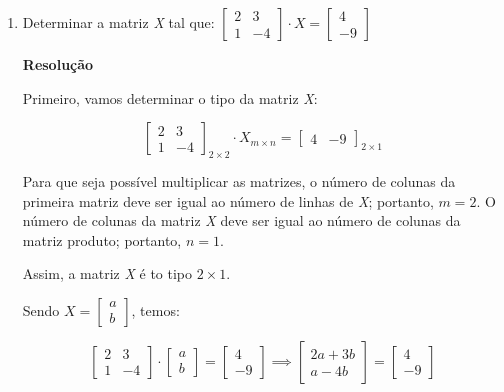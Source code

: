 \begin{exercise}\leavevmode
	\begin{enumerate}
		\item {
		      Determinar a matriz \textit{X} tal que: $\begin{bmatrix}
				      2 & 3  \\
				      1 & -4
			      \end{bmatrix} \cdot X = \begin{bmatrix}
				      4 \\
				      -9
			      \end{bmatrix}$

		      \vspace{.3cm}
		      \textbf{Resolução}
		      \vspace{.3cm}

		      Primeiro, vamos determinar o tipo da matriz \textit{X}:

		      \begin{equation*}
			      \begin{bmatrix}
				      2 & 3  \\
				      1 & -4
			      \end{bmatrix}_{2 \times 2} \cdot X_{m \times n} = \begin{bmatrix}
				      4 & -9
			      \end{bmatrix}_{2 \times 1}
		      \end{equation*}

		      Para que seja possível multiplicar as matrizes, o número de colunas da primeira
		      matriz deve ser igual ao número de linhas de \textit{X}; portanto, $m = 2$. O número
		      de colunas da matriz \textit{X} deve ser igual ao número de colunas da matriz produto;
		      portanto, $n = 1$.

		      Assim, a matriz \textit{X} é to tipo $2 \times 1$.

		      Sendo $X = \begin{bmatrix}
				      a \\ b
			      \end{bmatrix}$, temos:

		      \begin{equation*}
			      \begin{bmatrix}
				      2 & 3  \\
				      1 & -4
			      \end{bmatrix} \cdot \begin{bmatrix}
				      a \\
				      b
			      \end{bmatrix} = \begin{bmatrix}
				      4 \\
				      -9
			      \end{bmatrix} \implies \begin{bmatrix}
				      2a + 3b \\
				      a - 4b
			      \end{bmatrix} = \begin{bmatrix}
				      4 \\
				      -9
			      \end{bmatrix}
		      \end{equation*}

}
\end{enumerate}
\end{exercise}
